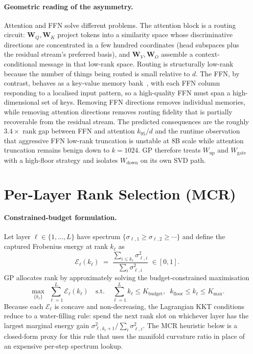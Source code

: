 \documentclass[11pt]{article}
\providecommand{\Wmat}{\mathbf{W}}
\begin{document}
\paragraph{Geometric reading of the asymmetry.}
Attention and FFN solve different problems. The attention block is a
routing circuit: $\Wmat_Q,\Wmat_K$ project tokens into a similarity
space whose discriminative directions are concentrated in a few hundred
coordinates (head subspaces plus the residual stream's preferred basis),
and $\Wmat_V,\Wmat_O$ assemble a context-conditional message in that
low-rank space. Routing is structurally low-rank because the number of
things being routed is small relative to $d$. The FFN, by contrast,
behaves as a key-value memory bank~\cite{geva2021ffn}, with each FFN
column responding to a localised input pattern, so a high-quality FFN
must span a high-dimensional set of keys. Removing FFN directions removes
individual memories, while removing attention directions removes routing
fidelity that is partially recoverable from the residual stream. The
predicted consequences are the roughly $3.4\times$ rank gap between
FFN and attention $k_{95}/d$ and the runtime observation that aggressive
FFN low-rank truncation is unstable at 8B scale while attention
truncation remains benign down to $k{=}1024$. GP therefore treats
$W_\text{up}$ and $W_\text{gate}$ with a high-floor strategy and isolates
$W_\text{down}$ on its own SVD path.

\section{Per-Layer Rank Selection (MCR)}
\label{sec:mcr}

\paragraph{Constrained-budget formulation.}
Let layer $\ell\in\{1,\dots,L\}$ have spectrum
$\{\sigma_{\ell,1}\geq\sigma_{\ell,2}\geq\cdots\}$ and define the captured
Frobenius energy at rank $k_\ell$ as
\begin{equation}
\mathcal{E}_\ell(k_\ell)\;=\;\frac{\sum_{i\le k_\ell}\sigma_{\ell,i}^2}{\sum_i\sigma_{\ell,i}^2}\;\in[0,1].
\label{eq:Eell}
\end{equation}
GP allocates rank by approximately solving the budget-constrained
maximisation
\begin{equation}
\max_{\{k_\ell\}}\;\sum_{\ell=1}^{L}\mathcal{E}_\ell(k_\ell)
\quad\text{s.t.}\quad
\sum_{\ell=1}^{L}k_\ell\le K_\text{budget},\;\;
k_\text{floor}\le k_\ell\le K_\text{max}.
\label{eq:mcr}
\end{equation}
Because each $\mathcal{E}_\ell$ is concave and non-decreasing, the
Lagrangian KKT conditions reduce to a water-filling rule: spend the next
rank slot on whichever layer has the largest marginal energy gain
$\sigma_{\ell,k_\ell+1}^2 / \sum_i\sigma_{\ell,i}^2$.  The MCR heuristic
below is a closed-form proxy for this rule that uses the manifold
curvature ratio in place of an expensive per-step spectrum lookup.
\end{document}
